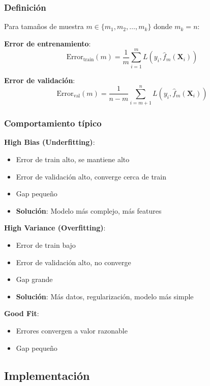 \documentclass[
  doc,
  floatsintext,
  longtable,
  a4paper,
  nolmodern,
  notxfonts,
  notimes,
  12pt,
  colorlinks=true,linkcolor=blue,citecolor=blue,urlcolor=blue]{apa7}
\providecommand{\tightlist}{%
  \setlength{\itemsep}{0pt}\setlength{\parskip}{0pt}}
\begin{document}
\subsubsection{Definición}\label{definiciuxf3n}

Para tamaños de muestra \(m \in \{m_1, m_2, \ldots, m_k\}\) donde
\(m_k = n\):

\textbf{Error de entrenamiento}: \[
\text{Error}_{\text{train}}(m) = \frac{1}{m} \sum_{i=1}^{m} L(y_i, \hat{f}_m(\mathbf{X}_i))
\]

\textbf{Error de validación}: \[
\text{Error}_{\text{val}}(m) = \frac{1}{n-m} \sum_{i=m+1}^{n} L(y_i, \hat{f}_m(\mathbf{X}_i))
\]

\subsubsection{Comportamiento típico}\label{comportamiento-tuxedpico}

\textbf{High Bias (Underfitting)}:

\begin{itemize}
\tightlist
\item
  Error de train alto, se mantiene alto
\item
  Error de validación alto, converge cerca de train
\item
  Gap pequeño
\item
  \textbf{Solución}: Modelo más complejo, más features
\end{itemize}

\textbf{High Variance (Overfitting)}:

\begin{itemize}
\tightlist
\item
  Error de train bajo
\item
  Error de validación alto, no converge
\item
  Gap grande
\item
  \textbf{Solución}: Más datos, regularización, modelo más simple
\end{itemize}

\textbf{Good Fit}:

\begin{itemize}
\tightlist
\item
  Errores convergen a valor razonable
\item
  Gap pequeño
\end{itemize}

\subsection{Implementación}\label{implementaciuxf3n}
\end{document}
